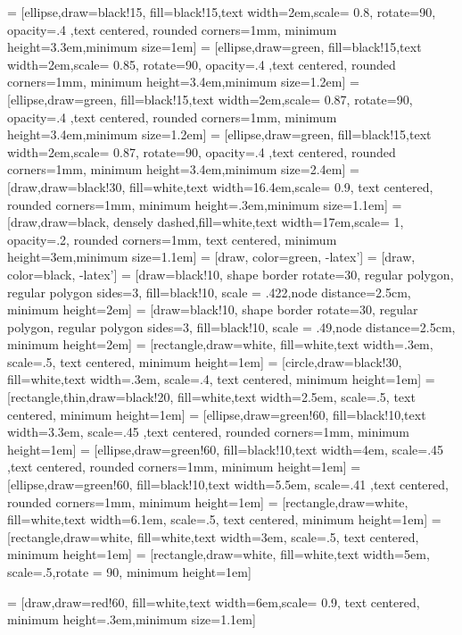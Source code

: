 \usepackage{lineno}

\usepackage[UTF8]{ctex} %

\usepackage{tikz}
\usetikzlibrary{shapes,arrows}
\usetikzlibrary{positioning,shadows,arrows}
\usetikzlibrary{calc}
 = [ellipse,draw=black!15, fill=black!15,text width=2em,scale= 0.8, rotate=90, opacity=.4 ,text centered, rounded corners=1mm, minimum height=3.3em,minimum size=1em]
 = [ellipse,draw=green, fill=black!15,text width=2em,scale= 0.85, rotate=90, opacity=.4 ,text centered, rounded corners=1mm, minimum height=3.4em,minimum size=1.2em]
 = [ellipse,draw=green, fill=black!15,text width=2em,scale= 0.87, rotate=90, opacity=.4 ,text centered, rounded corners=1mm, minimum height=3.4em,minimum size=1.2em]
 = [ellipse,draw=green, fill=black!15,text width=2em,scale= 0.87, rotate=90, opacity=.4 ,text centered, rounded corners=1mm, minimum height=3.4em,minimum size=2.4em]
 = [draw,draw=black!30, fill=white,text width=16.4em,scale= 0.9, text centered, rounded corners=1mm, minimum height=.3em,minimum size=1.1em]
 = [draw,draw=black, densely dashed,fill=white,text width=17em,scale= 1, opacity=.2, rounded corners=1mm, text centered, minimum height=3em,minimum size=1.1em]
 = [draw,  color=green, -latex']
 = [draw,  color=black, -latex']
 = [draw=black!10, shape border rotate=30, regular polygon, regular polygon sides=3, fill=black!10, scale = .422,node distance=2.5cm, minimum height=2em]
 = [draw=black!10, shape border rotate=30, regular polygon, regular polygon sides=3, fill=black!10, scale = .49,node distance=2.5cm, minimum height=2em]
 = [rectangle,draw=white, fill=white,text width=.3em, scale=.5, text centered, minimum height=1em]
 = [circle,draw=black!30, fill=white,text width=.3em, scale=.4, text centered, minimum height=1em]
 = [rectangle,thin,draw=black!20, fill=white,text width=2.5em, scale=.5, text centered, minimum height=1em]
 = [ellipse,draw=green!60, fill=black!10,text width=3.3em, scale=.45 ,text centered, rounded corners=1mm, minimum height=1em]
 = [ellipse,draw=green!60, fill=black!10,text width=4em, scale=.45 ,text centered, rounded corners=1mm, minimum height=1em]
 = [ellipse,draw=green!60, fill=black!10,text width=5.5em, scale=.41 ,text centered, rounded corners=1mm, minimum height=1em]
 = [rectangle,draw=white, fill=white,text width=6.1em, scale=.5, text centered, minimum height=1em]
 = [rectangle,draw=white, fill=white,text width=3em, scale=.5, text centered, minimum height=1em]
 = [rectangle,draw=white, fill=white,text width=5em, scale=.5,rotate = 90, minimum height=1em]

 = [draw,draw=red!60, fill=white,text width=6em,scale= 0.9, text centered, minimum height=.3em,minimum size=1.1em]

